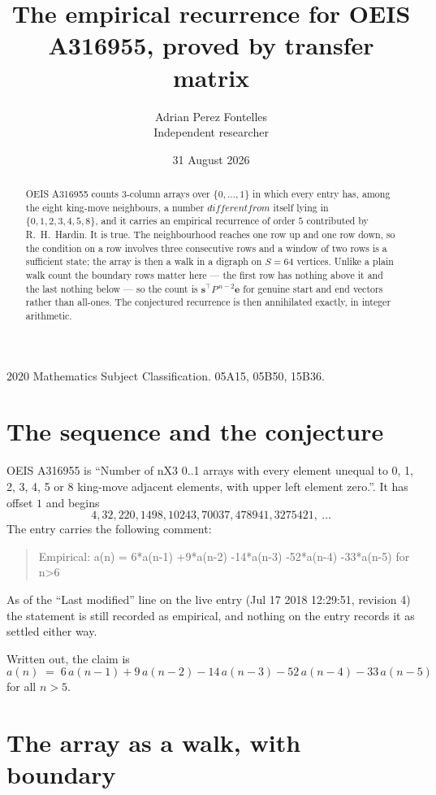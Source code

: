 \documentclass[11pt,a4paper]{article}
\title{The empirical recurrence for OEIS A316955, proved by transfer matrix}
\author{Adrian Perez Fontelles\\ \small Independent researcher}
\date{31 August 2026}
\theoremstyle{plain}
\theoremstyle{definition}
\begin{document}
\maketitle

\begin{abstract}
OEIS A316955 counts $3$-column arrays over $\{0,\dots,1\}$ in which every entry has,
among the eight king-move neighbours, a number $different from$ itself lying in $\{0,1,2,3,4,5,8\}$, and it carries an empirical
recurrence of order $5$ contributed by R.~H.~Hardin. It is true. The neighbourhood
reaches one row up and one row down, so the condition on a row involves three consecutive
rows and a window of two rows is a sufficient state; the array is then a walk in a digraph
on $S=64$ vertices. Unlike a plain walk count the boundary rows matter here --- the first
row has nothing above it and the last nothing below --- so the count is
$\mathbf{s}^{\!\top}P^{\,n-2}\mathbf{e}$ for genuine start and end vectors rather than
all-ones. The conjectured recurrence is then annihilated exactly, in integer arithmetic.
\end{abstract}

\noindent\small 2020 Mathematics Subject Classification. 05A15, 05B50, 15B36.\normalsize

\section{The sequence and the conjecture}

OEIS A316955 is ``Number of nX3 0..1 arrays with every element unequal to 0, 1, 2, 3, 4, 5 or 8 king-move adjacent elements, with upper left element zero.''. It has offset
$1$ and begins
\[
4, 32, 220, 1498, 10243, 70037, 478941, 3275421,\ \dots
\]
The entry carries the following comment:
\begin{quote}\small
Empirical: a(n) = 6*a(n-1) +9*a(n-2) -14*a(n-3) -52*a(n-4) -33*a(n-5) for n>6
\end{quote}
As of the ``Last modified'' line on the live entry (Jul 17 2018 12:29:51, revision
4) the statement is still recorded as empirical, and nothing on the entry
records it as settled either way.

Written out, the claim is
\begin{equation}\label{eq:conj}
a(n)\;=\;6\,a(n-1) + 9\,a(n-2) - 14\,a(n-3) - 52\,a(n-4) - 33\,a(n-5)
\end{equation}
for all $n>5$.

\section{The array as a walk, with boundary}
\end{document}

